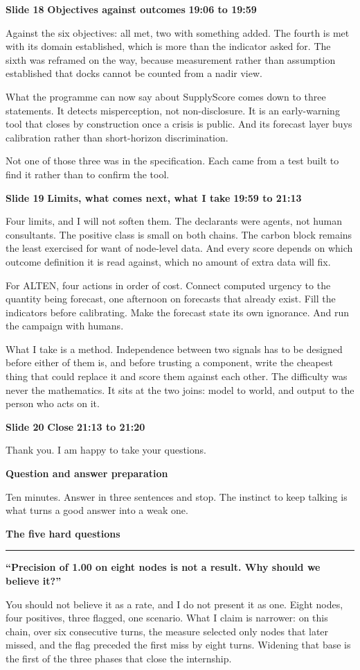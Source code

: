 \documentclass[a4paper,12pt]{article}
\newcommand{\SlideHeading}[3]{%
  \needspace{4\baselineskip}%
  \vspace{10pt}%
  \noindent\colorbox{altenBlueBg}{%
    \parbox{\dimexpr\linewidth-2\fboxsep}{%
      \vspace{3pt}%
      \textbf{\large\color{altenNavy}#1}\quad
      \textbf{\large\color{altenAzureDark}#2}%
      \hfill\textbf{\color{altenAzure}#3}%
      \vspace{3pt}}}%
  \vspace{5pt}\par}
\newcommand{\PartHeading}[1]{%
  \vspace{4pt}%
  {\noindent\LARGE\bfseries\color{altenNavy}#1\par}%
  \vspace{8pt}\par}
\newcommand{\SubHeading}[1]{%
  \needspace{3\baselineskip}%
  \vspace{10pt}%
  {\noindent\large\bfseries\color{altenAzureDark}#1\par}%
  \vspace{2pt}\par}
\newcommand{\Question}[1]{%
  \needspace{3\baselineskip}%
  \vspace{6pt}%
  \noindent\textcolor{altenOchreDark}{\rule{2.5pt}{\baselineskip}}\hspace{6pt}%
  \parbox[t]{\dimexpr\linewidth-14pt}{\textbf{#1}}%
  \vspace{5pt}\par}
\begin{document}
\SlideHeading{Slide 18}{Objectives against outcomes}{19:06 to 19:59}
Against the six objectives: all met, two with something added. The fourth is met with its domain established, which is more than the indicator asked for. The sixth was reframed on the way, because measurement rather than assumption established that docks cannot be counted from a nadir view.

What the programme can now say about SupplyScore comes down to three statements. It detects misperception, not non-disclosure. It is an early-warning tool that closes by construction once a crisis is public. And its forecast layer buys calibration rather than short-horizon discrimination.

Not one of those three was in the specification. Each came from a test built to find it rather than to confirm the tool.

\SlideHeading{Slide 19}{Limits, what comes next, what I take}{19:59 to 21:13}
Four limits, and I will not soften them. The declarants were agents, not human consultants. The positive class is small on both chains. The carbon block remains the least exercised for want of node-level data. And every score depends on which outcome definition it is read against, which no amount of extra data will fix.

For ALTEN, four actions in order of cost. Connect computed urgency to the quantity being forecast, one afternoon on forecasts that already exist. Fill the indicators before calibrating. Make the forecast state its own ignorance. And run the campaign with humans.

What I take is a method. Independence between two signals has to be designed before either of them is, and before trusting a component, write the cheapest thing that could replace it and score them against each other. The difficulty was never the mathematics. It sits at the two joins: model to world, and output to the person who acts on it.

\SlideHeading{Slide 20}{Close}{21:13 to 21:20}
Thank you. I am happy to take your questions.

\clearpage
\PartHeading{Question and answer preparation}
Ten minutes. Answer in three sentences and stop. The instinct to keep talking is what turns a good answer into a weak one.

\SubHeading{The five hard questions}
\Question{``Precision of 1.00 on eight nodes is not a result. Why should we believe it?''}
You should not believe it as a rate, and I do not present it as one. Eight nodes, four positives, three flagged, one scenario. What I claim is narrower: on this chain, over six consecutive turns, the measure selected only nodes that later missed, and the flag preceded the first miss by eight turns. Widening that base is the first of the three phases that close the internship.
\end{document}
